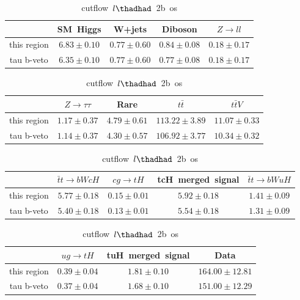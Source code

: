 \begin{table}
\caption{cutflow~$l\thadhad$~2b~os}
\centering
\begin{tabular}{|c|c|c|c|c|} \hline
 & SM~Higgs & W+jets & Diboson & $Z\to ll$\\\hline
this region & $6.83\pm0.10$ & $0.77\pm0.60$ & $0.84\pm0.08$ & $0.18\pm0.17$\\\hline
tau b-veto & $6.35\pm0.10$ & $0.77\pm0.60$ & $0.77\pm0.08$ & $0.18\pm0.17$\\\hline
\end{tabular}
\begin{tabular}{|c|c|c|c|c|} \hline
 & $Z\to \tau\tau$ & Rare & $t\bar{t}$ & $t\bar{t}V$\\\hline
this region & $1.17\pm0.37$ & $4.79\pm0.61$ & $113.22\pm3.89$ & $11.07\pm0.33$\\\hline
tau b-veto & $1.14\pm0.37$ & $4.30\pm0.57$ & $106.92\pm3.77$ & $10.34\pm0.32$\\\hline
\end{tabular}
\begin{tabular}{|c|c|c|c|c|} \hline
 & $\bar{t}t\to bWcH$ & $cg\to tH$ & tcH~merged~signal & $\bar{t}t\to bWuH$\\\hline
this region & $5.77\pm0.18$ & $0.15\pm0.01$ & $5.92\pm0.18$ & $1.41\pm0.09$\\\hline
tau b-veto & $5.40\pm0.18$ & $0.13\pm0.01$ & $5.54\pm0.18$ & $1.31\pm0.09$\\\hline
\end{tabular}
\begin{tabular}{|c|c|c|c|} \hline
 & $ug\to tH$ & tuH~merged~signal & Data\\\hline
this region & $0.39\pm0.04$ & $1.81\pm0.10$ & $164.00\pm12.81$\\\hline
tau b-veto & $0.37\pm0.04$ & $1.68\pm0.10$ & $151.00\pm12.29$\\\hline
\end{tabular}
\label{tab:cutflow_reg1l2tau2bnj_os}
\end{table}
